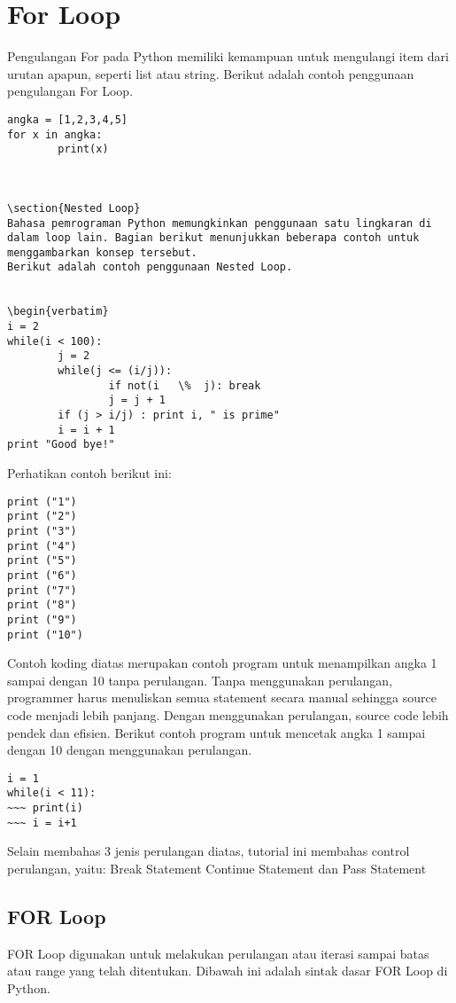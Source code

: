 \section {For Loop} 
Pengulangan For pada Python memiliki kemampuan untuk mengulangi item dari urutan apapun, seperti   list atau string. 
Berikut adalah contoh penggunaan pengulangan For Loop. 
\begin {verbatim}
angka = [1,2,3,4,5] 
for x in angka: 
        print(x)
		
		
		
\section{Nested Loop} 
Bahasa pemrograman Python memungkinkan penggunaan satu lingkaran di dalam loop lain. Bagian berikut menunjukkan beberapa contoh untuk menggambarkan konsep tersebut.   
Berikut adalah contoh penggunaan Nested Loop. 


\begin{verbatim}
i = 2 
while(i < 100): 
        j = 2 
        while(j <= (i/j)): 
                if not(i   \%  j): break 
                j = j + 1 
        if (j > i/j) : print i, " is prime" 
        i = i + 1 
print "Good bye!" 
\end{verbatim}
Perhatikan contoh berikut ini:
\begin{verbatim}
print ("1") 
print ("2") 
print ("3") 
print ("4") 
print ("5") 
print ("6") 
print ("7") 
print ("8") 
print ("9") 
print ("10") 
\end{verbatim}

Contoh koding diatas merupakan contoh program untuk menampilkan angka 1 sampai dengan 10 tanpa perulangan. Tanpa menggunakan perulangan, programmer harus menuliskan semua statement secara manual sehingga source code menjadi lebih panjang.
Dengan menggunakan perulangan, source code lebih pendek dan efisien. 
Berikut contoh program untuk mencetak angka 1 sampai dengan 10 dengan menggunakan perulangan.

\begin{verbatim}
i = 1 
while(i < 11): 
~~~ print(i) 
~~~ i = i+1 
\end{verbatim}

Selain membahas 3 jenis perulangan diatas, tutorial ini membahas control perulangan, yaitu: 
Break Statement 
Continue Statement 
dan Pass Statement 


\subsection{FOR Loop} 
FOR Loop digunakan untuk melakukan perulangan atau iterasi sampai batas atau range yang telah ditentukan.
Dibawah ini adalah sintak dasar FOR Loop di Python.

